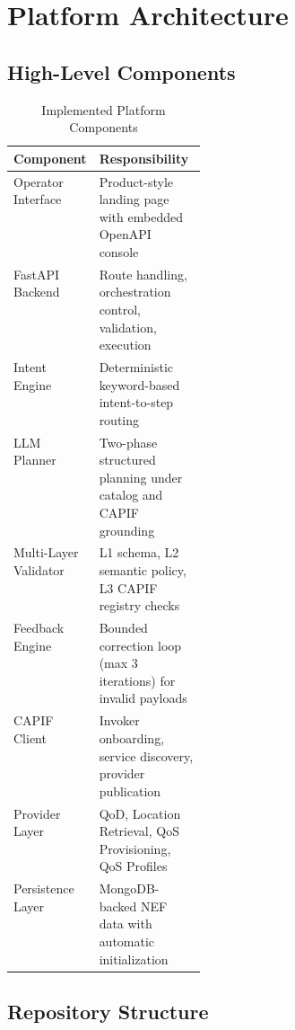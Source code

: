 \documentclass[conference]{IEEEtran}
\begin{document}
\section{Platform Architecture}

\subsection{High-Level Components}

\begin{table}[H]
\caption{Implemented Platform Components}
\label{tab:components}
\centering
\small
\begin{tabularx}{\linewidth}{P{0.25\linewidth} X}
\toprule
\textbf{Component} & \textbf{Responsibility} \\
\midrule
Operator Interface  & Product-style landing page with embedded OpenAPI console \\
FastAPI Backend     & Route handling, orchestration control, validation, execution \\
Intent Engine       & Deterministic keyword-based intent-to-step routing \\
LLM Planner         & Two-phase structured planning under catalog and CAPIF grounding \\
Multi-Layer Validator & L1 schema, L2 semantic policy, L3 CAPIF registry checks \\
Feedback Engine     & Bounded correction loop (max 3 iterations) for invalid payloads \\
CAPIF Client        & Invoker onboarding, service discovery, provider publication \\
Provider Layer      & QoD, Location Retrieval, QoS Provisioning, QoS Profiles \\
Persistence Layer   & MongoDB-backed NEF data with automatic initialization \\
\bottomrule
\end{tabularx}
\end{table}

\subsection{Repository Structure}
\end{document}

